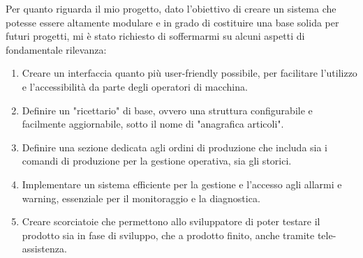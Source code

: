Per quanto riguarda il mio progetto, dato l'obiettivo di creare un sistema che potesse essere altamente modulare e in grado di costituire una base solida per futuri progetti, mi è stato richiesto di soffermarmi su alcuni aspetti di fondamentale rilevanza:
\begin{enumerate}
    \item Creare un interfaccia quanto più user-friendly possibile, per facilitare l'utilizzo e l'accessibilità da parte degli operatori di macchina.
    \item Definire un "ricettario" di base, ovvero una struttura configurabile e facilmente aggiornabile, sotto il nome di "anagrafica articoli".
    \item Definire una sezione dedicata agli ordini di produzione che includa sia i comandi di produzione per la gestione operativa, sia gli storici. 
    \item Implementare un sistema efficiente per la gestione e l'accesso agli allarmi e warning, essenziale per il monitoraggio e la diagnostica.
    \item Creare scorciatoie che permettono allo sviluppatore di poter testare il prodotto sia in fase di sviluppo, che a prodotto finito, anche tramite tele-assistenza.
\end{enumerate}

